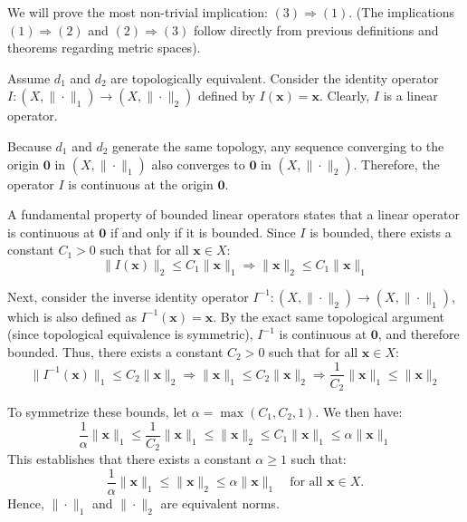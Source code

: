 \begin{pfbox}
We will prove the most non-trivial implication: $(3) \Rightarrow (1)$. (The implications $(1) \Rightarrow (2)$ and $(2) \Rightarrow (3)$ follow directly from previous definitions and theorems regarding metric spaces).

Assume $d_1$ and $d_2$ are topologically equivalent. 
Consider the identity operator $I: (X, \|\cdot\|_1) \to (X, \|\cdot\|_2)$ defined by $I(\mathbf{x}) = \mathbf{x}$. Clearly, $I$ is a linear operator.

Because $d_1$ and $d_2$ generate the same topology, any sequence converging to the origin $\mathbf{0}$ in $(X, \|\cdot\|_1)$ also converges to $\mathbf{0}$ in $(X, \|\cdot\|_2)$. Therefore, the operator $I$ is continuous at the origin $\mathbf{0}$.

A fundamental property of bounded linear operators states that a linear operator is continuous at $\mathbf{0}$ if and only if it is bounded. 
Since $I$ is bounded, there exists a constant $C_1 > 0$ such that for all $\mathbf{x} \in X$:
\[ \|I(\mathbf{x})\|_2 \le C_1\|\mathbf{x}\|_1 \Rightarrow \|\mathbf{x}\|_2 \le C_1\|\mathbf{x}\|_1 \]

Next, consider the inverse identity operator $I^{-1}: (X, \|\cdot\|_2) \to (X, \|\cdot\|_1)$, which is also defined as $I^{-1}(\mathbf{x}) = \mathbf{x}$. 
By the exact same topological argument (since topological equivalence is symmetric), $I^{-1}$ is continuous at $\mathbf{0}$, and therefore bounded. 
Thus, there exists a constant $C_2 > 0$ such that for all $\mathbf{x} \in X$:
\[ \|I^{-1}(\mathbf{x})\|_1 \le C_2\|\mathbf{x}\|_2 \Rightarrow \|\mathbf{x}\|_1 \le C_2\|\mathbf{x}\|_2 \Rightarrow \frac{1}{C_2}\|\mathbf{x}\|_1 \le \|\mathbf{x}\|_2 \]

To symmetrize these bounds, let $\alpha = \max(C_1, C_2, 1)$. We then have:
\[ \frac{1}{\alpha}\|\mathbf{x}\|_1 \le \frac{1}{C_2}\|\mathbf{x}\|_1 \le \|\mathbf{x}\|_2 \le C_1\|\mathbf{x}\|_1 \le \alpha\|\mathbf{x}\|_1 \]
This establishes that there exists a constant $\alpha \ge 1$ such that:
\[ \frac{1}{\alpha}\|\mathbf{x}\|_1 \le \|\mathbf{x}\|_2 \le \alpha\|\mathbf{x}\|_1 \quad \text{for all } \mathbf{x} \in X. \]
Hence, $\|\cdot\|_1$ and $\|\cdot\|_2$ are equivalent norms.
\end{pfbox}



